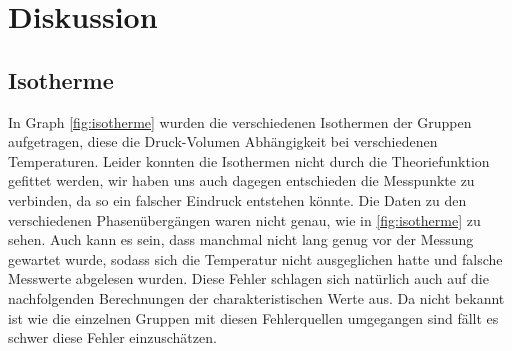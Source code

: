 \documentclass[11pt, a4paper]{article}
\begin{document}
    \section{Diskussion}
    \subsection{Isotherme}
    In Graph \ref{fig:isotherme} wurden die verschiedenen Isothermen der Gruppen aufgetragen, diese die Druck-Volumen Abhängigkeit
    bei verschiedenen Temperaturen.
    Leider konnten die Isothermen nicht durch die Theoriefunktion gefittet werden, wir haben uns auch dagegen entschieden die 
    Messpunkte zu verbinden, da so ein falscher Eindruck entstehen könnte. Die Daten zu den verschiedenen Phasenübergängen waren 
    nicht genau, wie in \ref{fig:isotherme} zu sehen. Auch kann es sein, dass manchmal nicht lang genug vor der 
    Messung gewartet wurde, sodass sich die Temperatur nicht ausgeglichen hatte und falsche Messwerte abgelesen wurden.
    Diese Fehler schlagen sich natürlich auch auf die nachfolgenden Berechnungen der charakteristischen Werte aus. 
    Da nicht bekannt ist wie die einzelnen Gruppen mit diesen Fehlerquellen umgegangen sind fällt es schwer diese Fehler einzuschätzen.
\end{document}
